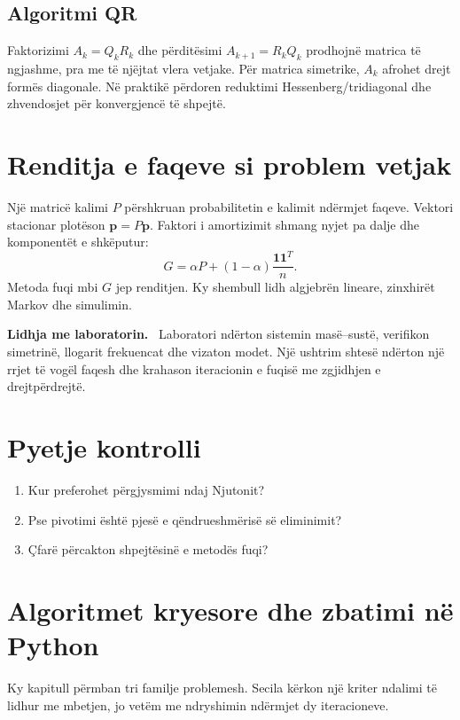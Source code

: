 \documentclass[11pt,oneside,openany]{book}
\newcommand{\vect}[1]{\bm{#1}}
\newenvironment{lidhje}{\par\medskip\noindent\textbf{Lidhja me laboratorin.}\ }{\par\medskip}
\begin{document}
\subsection{Algoritmi QR}
Faktorizimi $A_k=Q_kR_k$ dhe përditësimi $A_{k+1}=R_kQ_k$ prodhojnë matrica të ngjashme, pra me të njëjtat vlera vetjake. Për matrica simetrike, $A_k$ afrohet drejt formës diagonale. Në praktikë përdoren reduktimi Hessenberg/tridiagonal dhe zhvendosjet për konvergjencë të shpejtë.

\section{Renditja e faqeve si problem vetjak}
Një matricë kalimi $P$ përshkruan probabilitetin e kalimit ndërmjet faqeve. Vektori stacionar plotëson $\vect p=P\vect p$. Faktori i amortizimit shmang nyjet pa dalje dhe komponentët e shkëputur:
\begin{equation}
 G=\alpha P+(1-\alpha)\frac{\vect1\vect1^T}{n}.
\end{equation}
Metoda fuqi mbi $G$ jep renditjen. Ky shembull lidh algjebrën lineare, zinxhirët Markov dhe simulimin.

\begin{lidhje}
Laboratori ndërton sistemin masë--sustë, verifikon simetrinë, llogarit frekuencat dhe vizaton modet. Një ushtrim shtesë ndërton një rrjet të vogël faqesh dhe krahason iteracionin e fuqisë me zgjidhjen e drejtpërdrejtë.
\end{lidhje}

\section*{Pyetje kontrolli}
\begin{enumerate}
\item Kur preferohet përgjysmimi ndaj Njutonit?
\item Pse pivotimi është pjesë e qëndrueshmërisë së eliminimit?
\item Çfarë përcakton shpejtësinë e metodës fuqi?
\end{enumerate}

\section{Algoritmet kryesore dhe zbatimi në Python}
Ky kapitull përmban tri familje problemesh. Secila kërkon një kriter ndalimi të lidhur me mbetjen, jo vetëm me ndryshimin ndërmjet dy iteracioneve.
\end{document}
